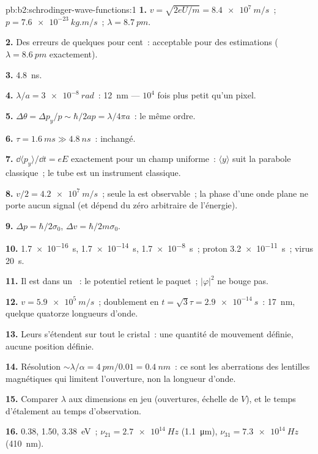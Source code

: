 \begin{solution}{pb:b2:schrodinger-wave-functions:1}
\textbf{1.} $v = \sqrt{2eU/m} = \qty{8.4e7}{m/s}$~; $p = \qty{7.6e-23}{kg.m/s}$~; $\lambda =
\qty{8.7}{pm}$.

\textbf{2.} Des erreurs de quelques pour cent~: acceptable pour des estimations ($\lambda =
\qty{8.6}{pm}$ exactement).

\textbf{3.} \qty{4.8}{ns}.

\textbf{4.} $\lambda/a = \qty{3e-8}{rad}$~: \qty{12}{nm} --- $10^4$ fois plus petit qu'un
pixel.

\textbf{5.} $\Delta\theta = \Delta p_y/p \sim \hbar/2ap = \lambda/4\pi a$~: le même ordre.

\textbf{6.} $\tau = \qty{1.6}{ms} \gg \qty{4.8}{ns}$~: inchangé.

\textbf{7.} $\dd\langle p_y\rangle/\dd t = eE$ exactement pour un champ uniforme~:
$\langle y\rangle$ suit la parabole classique~; le tube est un
instrument classique.

\textbf{8.} $v/2 = \qty{4.2e7}{m/s}$~; seule la  est observable~;
la phase d'une onde plane ne porte aucun signal (et dépend du zéro
arbitraire de l'énergie).

\textbf{9.} $\Delta p = \hbar/2\sigma_0$, $\Delta v = \hbar/2m\sigma_0$.

\textbf{10.} \qty{1.7e-16}{s}, \qty{1.7e-14}{s}, \qty{1.7e-8}{s}~; proton \qty{3.2e-11}{s}~;
virus \qty{20}{s}.

\textbf{11.} Il est dans un ~: le potentiel retient le
paquet~; $|\varphi|^2$ ne bouge pas.

\textbf{12.} $v = \qty{5.9e5}{m/s}$~; doublement en $t = \sqrt3\tau = \qty{2.9e-14}{s}$~:
\qty{17}{nm}, quelque quatorze longueurs d'onde.

\textbf{13.} Leurs  s'étendent sur tout le cristal~: une
quantité de mouvement définie, aucune position définie.

\textbf{14.} Résolution $\sim\lambda/\alpha = \qty{4}{pm}/0.01 = \qty{0.4}{nm}$~: ce sont les
aberrations des lentilles magnétiques qui limitent l'ouverture, non la longueur d'onde.

\textbf{15.} Comparer $\lambda$ aux dimensions en jeu (ouvertures,
échelle de $V$), et le temps d'étalement au temps d'observation.

\textbf{16.} \qty{0.38}{}, \qty{1.50}{}, \qty{3.38}{eV}~; $\nu_{21} = \qty{2.7e14}{Hz}$
(\qty{1.1}{\micro m}), $\nu_{31} = \qty{7.3e14}{Hz}$ (\qty{410}{nm}).


\end{solution}
